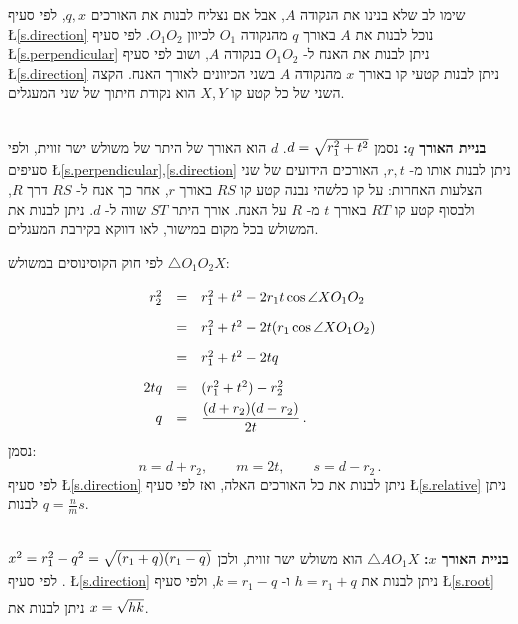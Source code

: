 שימו לב שלא בנינו את הנקודה
$A$,
אבל אם נצליח לבנות את האורכים
$q,x$,
לפי סעיף
\L{\ref{s.direction}}
נוכל לבנות את 
$A$
באורך
$q$
מהנקודה
$O_1$
לכיוון
$O_1O_2$.
לפי סעיף
\L{\ref{s.perpendicular}}
ניתן לבנות את האנח ל-%
$O_1O_2$
בנקודה
$A$,
ושוב לפי סעיף
\L{\ref{s.direction}}
ניתן לבנות קטעי קו באורך
$x$
מהנקודה
$A$
בשני הכיוונים לאורך האנח. הקצה השני של כל קטע קו
$X,Y$
הוא נקודת חיתוך של שני המעגלים.

\textbf{%
בניית האורך
$q$:}
נסמן
$\rule[-5pt]{0pt}{30pt}d=\sqrt{r_1^2+t^2}$.
$d$
הוא האורך של היתר של משולש ישר זווית, ולפי סעיפים
\L{\ref{s.perpendicular},\ref{s.direction}}
ניתן לבנות אותו מ-%
$r,t$,
האורכים הידועים של שני הצלעות האחרות: על קו כלשהי נבנה קטע קו
$RS$
באורך
$r$,
אחר כך אנח ל-%
$RS$
דרך
$R$,
ולבסוף קטע קו
$RT$
באורך 
$t$
מ-%
$R$
על האנח. אורך היתר
$ST$
שווה ל-%
$d$.
ניתן לבנות את המשולש בכל מקום במישור, לאו דווקא בקירבת המעגלים.

לפי חוק הקוסינוסים במשולש
$\triangle O_1O_2X$:
\vspace*{-8pt}
\[
\renewcommand*{\arraystretch}{1.8}
\begin{array}{rcl}
r_2^2 &=& r_1^2 + t^2 - 2r_1t\cos\angle XO_1O_2\\
      &=& r_1^2 + t^2 - 2t(r_1\cos\angle XO_1O_2)\\
&=& r_1^2 + t^2 - 2tq\\
2tq &=& (r_1^2+t^2) - r_2^2\\
q&=&\disfrac{(d+r_2)(d-r_2)}{2t}\,.
\end{array}
\]
נסמן:
\[
n= d+ r_2, \quad\quad m= 2t,\quad\quad s =d -r_2\,.
\]
לפי סעיף
\L{\ref{s.direction}}
ניתן לבנות את כל האורכים האלה, ואז לפי סעיף
\L{\ref{s.relative}}
ניתן לבנות
$q=\frac{n}{m}s$.

\textbf{%
בניית האורך
$x$:}
$\triangle AO_1X$
הוא משולש ישר זווית, ולכן
$\rule[-5pt]{0pt}{30pt}x^2=r_1^2-q^2 =\sqrt{(r_1+q)(r_1-q)}$.
לפי סעיף
\L{\ref{s.direction}}
ניתן לבנות את
$h =r_1+ q$
ו-%
$k= r_1 - q$,
ולפי סעיף
\L{\ref{s.root}}
ניתן לבנות את
$\rule[-5pt]{0pt}{20pt}x= \sqrt{hk}$. 

